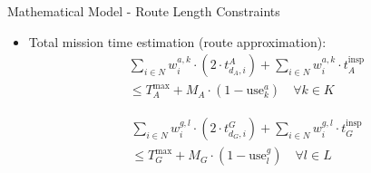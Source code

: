 \documentclass[aspectratio=169,11pt,xcolor={dvipsnames},hyperref={pdftex,pdfpagemode=UseNone,hidelinks,pdfdisplaydoctitle=true},usepdftitle=false]{beamer}
\begin{document}
  \begin{frame}{Mathematical Model - Route Length Constraints}
    \begin{itemize}
      \item Total mission time estimation (route approximation):
      \begin{align}
        \sum_{i \in N} w_i^{a,k} \cdot \left( 2 \cdot t_{d_A,i}^{A}\right) + \sum_{i \in N} w_i^{a,k} \cdot t_A^{\text{insp}} \\ 
        \leq T_A^{\max} + M_A \cdot (1 - \text{use}_k^a) \quad \forall k \in K
      \end{align}
      
      \begin{align}
        \sum_{i \in N} w_i^{g,l} \cdot \left( 2 \cdot t_{d_G,i}^{G}\right) + \sum_{i \in N} w_i^{g,l} \cdot t_G^{\text{insp}} \\
        \leq T_G^{\max} + M_G \cdot (1 - \text{use}_l^g) \quad \forall l \in L
      \end{align}
    \end{itemize}
  \end{frame}
\end{document}
